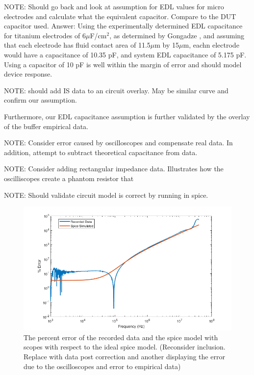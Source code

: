 \par NOTE: Should go back and look at assumption for EDL values for micro electrodes and calculate what the equivalent capacitor. Compare to the DUT capacitor used. Answer: Using the experimentally determined EDL capacitance for titanium electrodes of 6$\mu$F/cm$^2$, as determined by Gongadze \cite{_gongadze.pdf_????}, and assuming that each electrode has fluid contact area of 11.5$\mu$m by 15$\mu$m, eachn electrode would have a capacitance of 10.35 pF, and system EDL capacitance of 5.175 pF. Using a capacitor of 10 pF is well within the margin of error and should model device response. 

\par NOTE: should add IS data to an circuit overlay. May be similar curve and confirm our assumption.

\par Furthermore, our EDL capacitance assumption is further validated by the overlay of the buffer empirical data.

\par NOTE: Consider error caused by oscilloscopes and compensate real data. In addition, attempt to subtract theoretical capacitance from data.

\par NOTE: Consider adding rectangular impedance data. Illustrates how the oscilliscopes create a phantom resistor that 

\par NOTE: Should validate circuit model is correct by running in spice.

\begin{figure}[H]
    \centering
    \includegraphics[width=\textwidth]{images/measurementError.png}
    \caption{The percent error of the recorded data and the spice model with scopes with respect to the ideal spice model. (Reconsider inclusion. Replace with data post correction and another displaying the error due to the oscilloscopes and error to empirical data)}
    \label{fig:test_circ_measurement_error}
\end{figure}


